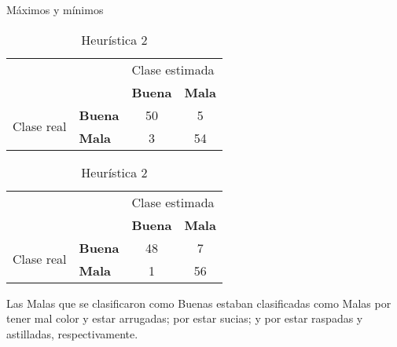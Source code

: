 \begin{table}[!htb]
\renewcommand\tablename{Tablas}
\renewcommand{\arraystretch}{1.1}
\setlength{\extrarowheight}{4pt}%
\label{tablas:matricesdeconfusion}
    \begin{subtable}{.5\linewidth}
\centering
\caption{Máximos y mínimos}
\label{tablas:matricesdeconfusiona}
\begin{tabular}{llll}
                            &                            & \multicolumn{2}{l}{Clase estimada}                \\
                            &                            & \textbf{Buena}                   & \textbf{Mala}                    \\ \cline{3-4} 
\multirow{2}{*}{Clase real} & \multicolumn{1}{l|}{\textbf{Buena}} & \multicolumn{1}{c|}{50} & \multicolumn{1}{c|}{5}  \\ \cline{3-4} 
                            & \multicolumn{1}{l|}{\textbf{Mala}}  & \multicolumn{1}{c|}{3}  & \multicolumn{1}{c|}{54} \\ \cline{3-4} 
\end{tabular}
    \end{subtable}%
    \begin{subtable}{.5\linewidth}
\centering
\caption{Heurística 2}
\label{tablas:matricesdeconfusionb}
\begin{tabular}{llll}
                            &                            & \multicolumn{2}{l}{Clase estimada}                \\
                            &                            & \textbf{Buena}                   & \textbf{Mala}                    \\ \cline{3-4} 
\multirow{2}{*}{Clase real} & \multicolumn{1}{l|}{\textbf{Buena}} & \multicolumn{1}{c|}{48} & \multicolumn{1}{c|}{7}  \\ \cline{3-4} 
                            & \multicolumn{1}{l|}{\textbf{Mala}}  & \multicolumn{1}{c|}{1}  & \multicolumn{1}{c|}{56} \\ \cline{3-4} 
\end{tabular}
    \end{subtable} 
\end{table}

Las Malas que se clasificaron como Buenas estaban clasificadas como Malas por tener mal color y estar arrugadas; por estar sucias; y por estar raspadas y astilladas, respectivamente.

